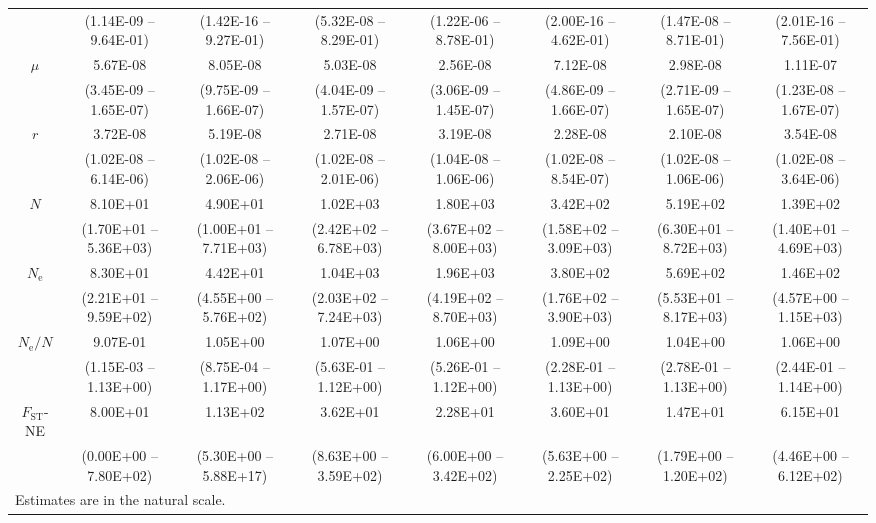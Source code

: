 \documentclass[a4paper, 12pt]{article}
\begin{document}
\begin{table}
\begin{tiny}
\begin{tabular}{cccccccc}
         & (1.14E-09 – 9.64E-01) & (1.42E-16 – 9.27E-01) & (5.32E-08 – 8.29E-01) & (1.22E-06 – 8.78E-01) & (2.00E-16 – 4.62E-01) & (1.47E-08 – 8.71E-01) & (2.01E-16 – 7.56E-01) \\
        $\mu$ & 5.67E-08 & 8.05E-08 & 5.03E-08 & 2.56E-08 & 7.12E-08 & 2.98E-08 & 1.11E-07 \\
         & (3.45E-09 – 1.65E-07) & (9.75E-09 – 1.66E-07) & (4.04E-09 – 1.57E-07) & (3.06E-09 – 1.45E-07) & (4.86E-09 – 1.66E-07) & (2.71E-09 – 1.65E-07) & (1.23E-08 – 1.67E-07) \\
        $r$ & 3.72E-08 & 5.19E-08 & 2.71E-08 & 3.19E-08 & 2.28E-08 & 2.10E-08 & 3.54E-08 \\
         & (1.02E-08 – 6.14E-06) & (1.02E-08 – 2.06E-06) & (1.02E-08 – 2.01E-06) & (1.04E-08 – 1.06E-06) & (1.02E-08 – 8.54E-07) & (1.02E-08 – 1.06E-06) & (1.02E-08 – 3.64E-06) \\
        $N$ & 8.10E+01 & 4.90E+01 & 1.02E+03 & 1.80E+03 & 3.42E+02 & 5.19E+02 & 1.39E+02 \\
         & (1.70E+01 – 5.36E+03) & (1.00E+01 – 7.71E+03) & (2.42E+02 – 6.78E+03) & (3.67E+02 – 8.00E+03) & (1.58E+02 – 3.09E+03) & (6.30E+01 – 8.72E+03) & (1.40E+01 – 4.69E+03) \\
        $N_{\mathrm{e}}$ & 8.30E+01 & 4.42E+01 & 1.04E+03 & 1.96E+03 & 3.80E+02 & 5.69E+02 & 1.46E+02 \\
         & (2.21E+01 – 9.59E+02) & (4.55E+00 – 5.76E+02) & (2.03E+02 – 7.24E+03) & (4.19E+02 – 8.70E+03) & (1.76E+02 – 3.90E+03) & (5.53E+01 – 8.17E+03) & (4.57E+00 – 1.15E+03) \\
        $N_{\mathrm{e}}/N$ & 9.07E-01 & 1.05E+00 & 1.07E+00 & 1.06E+00 & 1.09E+00 & 1.04E+00 & 1.06E+00 \\
         & (1.15E-03 – 1.13E+00) & (8.75E-04 – 1.17E+00) & (5.63E-01 – 1.12E+00) & (5.26E-01 – 1.12E+00) & (2.28E-01 – 1.13E+00) & (2.78E-01 – 1.13E+00) & (2.44E-01 – 1.14E+00) \\
         \midrule
        $F_{\mathrm{ST}}$-NE & 8.00E+01 & 1.13E+02 & 3.62E+01 & 2.28E+01 & 3.60E+01 & 1.47E+01 & 6.15E+01 \\
         & (0.00E+00 – 7.80E+02) & (5.30E+00 – 5.88E+17) & (8.63E+00 – 3.59E+02) & (6.00E+00 – 3.42E+02) & (5.63E+00 – 2.25E+02) & (1.79E+00 – 1.20E+02) & (4.46E+00 – 6.12E+02) \\
          \bottomrule
    \multicolumn{8}{l}{\tiny  Estimates are in the natural scale.} \\
    \end{tabular}
\label{tab:supple_bees_posteriors}
\end{tiny}
\end{table}
\end{document}

